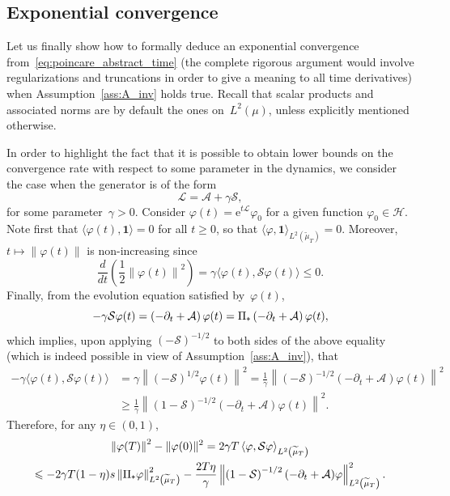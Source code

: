\documentclass[AHL,Unicode,longabstracts,MathTools,published]{cedram}
\newcommand{\rme}{\mathrm{e}}
\newcommand{\cL}{\mathcal{L}}
\newcommand{\cLs}{\mathcal{S}}
\newcommand{\cLa}{\mathcal{A}}
\newcommand{\cH}{\mathcal{H}}
\newcommand{\bfun}{\mathbf{1}}
\newcommand{\subplus}{\textnormal{\texttt{+}}}
\renewcommand{\leq}{\leqslant}
\renewcommand{\geq}{\geqslant}
\begin{document}
\subsection{Exponential convergence}
Let us finally show how to formally deduce an exponential convergence from~\eqref{eq:poincare_abstract_time} (the complete rigorous argument would involve regularizations and truncations in order to give a meaning to all time derivatives) when Assumption~\ref{ass:A_inv} holds true. Recall that scalar products and associated norms are by default the ones on~$L^2(\mu)$, unless explicitly mentioned otherwise.

In order to highlight the fact that it is possible to obtain lower bounds on the convergence rate with respect to some parameter in the dynamics, we consider the case when the generator is of the form
\[
\cL = \cLa + \gamma \cLs,
\]
for some parameter~$\gamma > 0$. Consider $\varphi(t) = \rme^{t \cL} \varphi_0$ for a given function $\varphi_0 \in \cH$. Note first that $\langle \varphi(t),\bfun\rangle = 0$ for all $t \geq 0$, so that $\langle \varphi,\bfun\rangle_{L^2(\widetilde{\mu}_T)} = 0$. Moreover, $t \mapsto \|\varphi(t)\|$ is non-increasing since
\[
\frac{d}{dt}\left(\frac12 \left\|\varphi(t)\right\|^2\right) = \gamma \big\langle\varphi(t),\cLs\varphi(t)\big\rangle \leq 0.
\]
Finally, from the evolution equation satisfied by~$\varphi(t)$,
\[
-\gamma \cLs \varphi(t) = \left(-\partial_t + \cLa\right) \varphi(t) = \Pi_\subplus\left(-\partial_t + \cLa\right) \varphi(t),
\]
which implies, upon applying $(-\cLs)^{-1/2}$ to both sides of the above equality (which is indeed possible in view of Assumption~\ref{ass:A_inv}), that
\begin{align*}
-\gamma \big\langle\varphi(t),\cLs\varphi(t)\big\rangle & = \gamma \left\| (-\cLs)^{1/2} \varphi(t) \right\|^2 = \frac1\gamma \left\| (-\cLs)^{-1/2}(-\partial_t + \cLa)\varphi(t)\right\|^2\\
& \geq \frac1\gamma \left\| (1-\cLs)^{-1/2}(-\partial_t + \cLa)\varphi(t)\right\|^2.
\end{align*}
Therefore, for any $\eta \in (0,1)$,
\begin{multline*}
\left\|\varphi(T)\right\|^2 - \|\varphi(0)\|^2 = 2\gamma T \left\langle\varphi,\cLs\varphi \right\rangle_{L^2\left(\widetilde{\mu}_T\right)} \\
\leq - 2\gamma T(1-\eta)s \left\| \Pi_\subplus \varphi \right\|_{L^2\left(\widetilde{\mu}_T\right)}^2 - \frac{2T\eta}{\gamma} \left\| \left(1-\cLs\right)^{-1/2}(-\partial_t + \cLa) \varphi \right\|_{L^2\left(\widetilde{\mu}_T\right)}^2.
\end{multline*}
\end{document}
